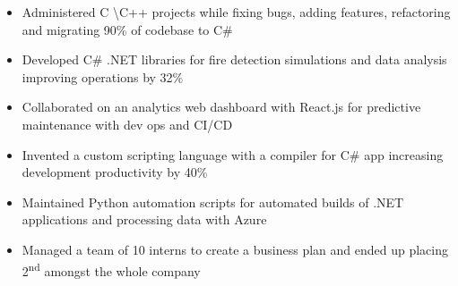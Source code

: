 \documentclass[11pt,a4paper,ragged2e]{altacv}
\begin{document}
\begin{paracol}{1}
\begin{itemize}
\item Administered C \textbackslash C++ projects while fixing bugs, adding features, refactoring and migrating 90\% of codebase to C\#
\item Developed C\# .NET libraries for fire detection simulations and data analysis improving operations by 32\%
\item Collaborated on an analytics web dashboard with React.js for predictive maintenance with dev ops and CI/CD
\item Invented a custom scripting language with a compiler for C\# app increasing development productivity by 40\%
\item Maintained Python automation scripts for automated builds of .NET applications and processing data with Azure
\item Managed a team of 10 interns to create a business plan and ended up placing  2\textsuperscript{nd} amongst the whole company
\end{itemize}
\tightdivider


\end{paracol}
\end{document}
